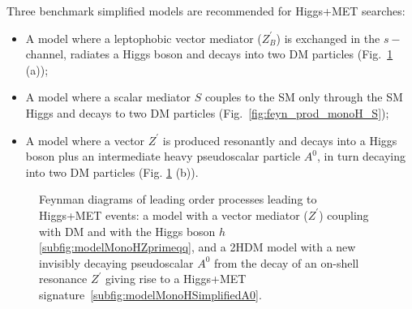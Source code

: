 Three benchmark simplified models \cite{Carpenter:2013xra,Berlin:2014cfa} 
are recommended for Higgs+MET searches:
\begin{itemize}
	\item A model where a leptophobic vector mediator ($Z_B^\prime$) is exchanged in the $s-$channel, 
	radiates a Higgs boson and decays into two DM particles (Fig.~\ref{fig:feyn_prod_monoH} (a));
    \item A model where a scalar mediator $S$ couples to the SM only 
	through the SM Higgs and decays to two DM particles (Fig.~\ref{fig:feyn_prod_monoH_S});
	\item A model where a vector $Z^\prime$ is produced resonantly and decays into a Higgs boson
	plus an intermediate heavy pseudoscalar particle $A^0$, in turn decaying into two DM particles (Fig. \ref{fig:feyn_prod_monoH} (b)). 
\end{itemize}


\begin{figure}[!h!tpd]
	\centering
	\textwidth
	\caption
	{
		Feynman diagrams of leading order processes leading to Higgs+MET events: a model with a vector mediator ($Z^\prime$) 
		coupling with DM and with the Higgs boson $h$ \ref{subfig:modelMonoHZprimeqq}, and
		a 2HDM model with a new invisibly decaying pseudoscalar $A^0$ 
		from the decay of an on-shell resonance $Z^\prime$ giving rise to a Higgs+MET signature~\ref{subfig:modelMonoHSimplifiedA0}.
	}
	\label{fig:feyn_prod_monoH}
\end{figure}
		
